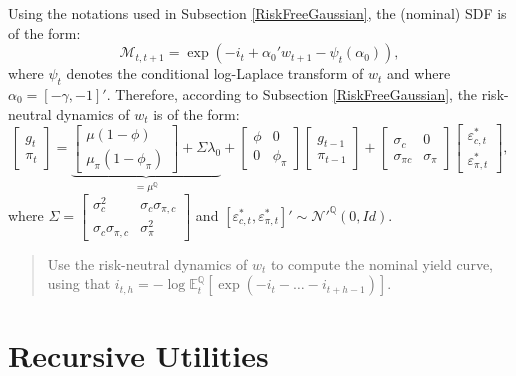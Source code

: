\documentclass[
  12pt,
]{book}
\theoremstyle{definition}
\theoremstyle{definition}
\theoremstyle{definition}
\theoremstyle{definition}
\theoremstyle{remark}
\begin{document}
Using the notations used in Subsection \ref{RiskFreeGaussian}, the (nominal) SDF is of the form:
\[
\mathcal{M}_{t,t+1} = \exp(-i_t + \alpha_0'w_{t+1} - \psi_{t}(\alpha_0)),
\]
where \(\psi_t\) denotes the conditional log-Laplace transform of \(w_t\) and where \(\alpha_0 = [-\gamma,-1]'\). Therefore, according to Subsection \ref{RiskFreeGaussian}, the risk-neutral dynamics of \(w_t\) is of the form:
\[
\left[\begin{array}{c}g_t\\
\pi_t\end{array}\right] = 
\underbrace{\left[\begin{array}{c} \mu (1-\phi)\\
\mu_\pi(1-\phi_\pi)\end{array}\right]+\Sigma \lambda_0}_{=\mu^{\mathbb{Q}}}+
\left[\begin{array}{cc} \phi & 0\\
0 & \phi_\pi\end{array}\right]\left[\begin{array}{c}g_{t-1}\\
\pi_{t-1}\end{array}\right]+
\left[\begin{array}{cc} \sigma_c & 0\\
\sigma_{\pi c} & \sigma_\pi\end{array}\right]\left[\begin{array}{c}\varepsilon_{c,t}^*\\
\varepsilon_{\pi,t}^*\end{array}\right],
\]
where \(\Sigma = \left[\begin{array}{cc}\sigma_c^2&\sigma_c\sigma_{\pi,c}\\ \sigma_c\sigma_{\pi,c}&\sigma_{\pi}^2 \end{array}\right]\) and \([\varepsilon_{c,t}^*,\varepsilon_{\pi,t}^*]'\sim \mathcal{N}'^{\mathbb{Q}}(0,Id)\).

\begin{quote}
Use the risk-neutral dynamics of \(w_t\) to compute the nominal yield curve, using that \(i_{t,h} = - \log \mathbb{E}^{\mathbb{Q}}_t [\exp(-i_t - \dots - i_{t+h-1})]\).
\end{quote}

\hypertarget{recursive-utilities}{%
\section{Recursive Utilities}\label{recursive-utilities}}
\end{document}
